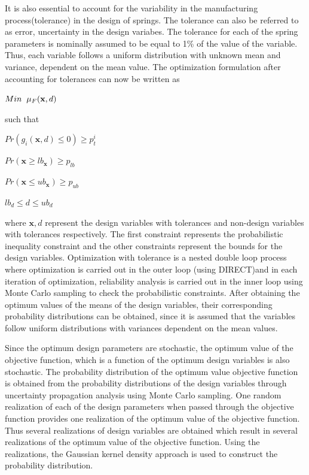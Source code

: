 \documentclass[10pt]{article}
\begin{document}
\hspace{5 mm} It is also essential to account for the variability in the manufacturing process(tolerance) in the design of springs. The tolerance can also be referred to as error, uncertainty in the design variabes. The tolerance for each of the spring parameters is nominally assumed to be equal to 1\% of the value of the variable. Thus, each variable follows a uniform distribution with unknown mean and variance, dependent on the mean value. The optimization formulation after accounting for tolerances can now be written as 

\centerline{$Min \hspace{2mm} \mu_{F} (\textbf{x},d)$}

such that

\centerline{$Pr(g_{i}(\textbf{x},d) \leq 0)\geq p_{t}^{i}$}
\centerline{$Pr(\textbf{x} \geq lb_{\textbf{x}})\geq p_{lb}$}
\centerline{$Pr(\textbf{x} \leq ub_{\textbf{x}})\geq p_{ub}$}
\centerline{$lb_{d} \leq d \leq ub_{d}$}

\noindent where $\mathbf{x},d$ represent the design variables with tolerances and non-design variables with tolerances respectively. The first constraint represents the probabilistic inequality constraint and the other constraints represent the bounds for the design variables. Optimization with tolerance is a nested double loop process where optimization is carried out in the outer loop (using DIRECT)and in each iteration of optimization, reliability analysis is carried out in the inner loop using Monte Carlo sampling to check the probabilistic constraints. After obtaining the optimum values of the means of the design variables, their corresponding probability distributions can be obtained, since it is assumed that the variables follow uniform distributions with variances dependent on the mean values. 

Since the optimum design parameters are stochastic, the optimum value of the objective function, which is a function of the optimum design variables is also stochastic. The probability distribution of the optimum value objective function is obtained from the probability distributions of the design variables through uncertainty propagation analysis using Monte Carlo sampling. One random realization of each of the design parameters when passed through the objective function provides one realization of the optimum value of the objective function. Thus several realizations of design variables are obtained which result in several realizations of the optimum value of the objective function. Using the realizations, the Gaussian kernel density approach is used to construct the probability distribution.
\end{document}
